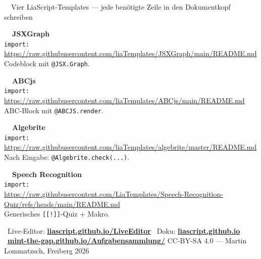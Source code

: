 \documentclass[a4paper,landscape,9pt]{extarticle}
\newcommand{\sheetfooter}{%
  \vfill
  {\sffamily\scriptsize\color{muted}
  \faInfoCircle~Live-Editor: \href{https://liascript.github.io/LiveEditor/}{\textbf{liascript.github.io/LiveEditor}}\hfill
  \faBook~Doku: \href{https://liascript.github.io}{\textbf{liascript.github.io}}\hfill
  \faGithub~\href{https://mint-the-gap.github.io/Aufgabensammlung/}{\textbf{mint-the-gap.github.io/Aufgabensammlung/}} \quad
  CC-BY-SA 4.0 — Martin Lommatzsch, Freiberg 2026}}
\begin{document}
\noindent
\begin{liainfo}{\faPuzzlePiece~~Vier LiaScript-Templates — jede benötigte Zeile in den Dokumentkopf schreiben}
\scriptsize
\begin{minipage}[t]{0.24\linewidth}
\textbf{\color{liagreen}\faProjectDiagram~~JSXGraph}\\[1pt]
\texttt{import:}\\[-1pt]
{\tiny\url{https://raw.githubusercontent.com/liaTemplates/JSXGraph/main/README.md}}\\[1pt]
Codeblock mit \texttt{@JSX.Graph}.
\end{minipage}\hfill
\begin{minipage}[t]{0.24\linewidth}
\textbf{\color{liagreen}\faMusic~~ABCjs}\\[1pt]
\texttt{import:}\\[-1pt]
{\tiny\url{https://raw.githubusercontent.com/liaTemplates/ABCjs/main/README.md}}\\[1pt]
ABC-Block mit \texttt{@ABCJS.render}.
\end{minipage}\hfill
\begin{minipage}[t]{0.24\linewidth}
\textbf{\color{liagreen}\faCalculator~~Algebrite}\\[1pt]
\texttt{import:}\\[-1pt]
{\tiny\url{https://raw.githubusercontent.com/liaTemplates/algebrite/master/README.md}}\\[1pt]
Nach Eingabe: \texttt{@Algebrite.check(...)}.
\end{minipage}\hfill
\begin{minipage}[t]{0.24\linewidth}
\textbf{\color{liagreen}\faMicrophone~~Speech Recognition}\\[1pt]
\texttt{import:}\\[-1pt]
{\tiny\url{https://raw.githubusercontent.com/LiaTemplates/Speech-Recognition-Quiz/refs/heads/main/README.md}}\\[1pt]
Generisches \texttt{[[!]]}-Quiz + Makro.
\end{minipage}
\end{liainfo}

\sheetfooter

\newpage
\end{document}
